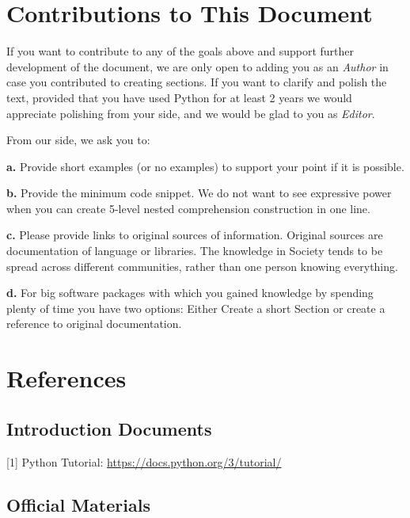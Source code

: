 \documentclass[
]{article}
\begin{document}
\hypertarget{contributions-to-this-document}{%
\section{Contributions to This
Document}\label{contributions-to-this-document}}

If you want to contribute to any of the goals above and support further
development of the document, we are only open to adding you as an
\emph{Author} in case you contributed to creating sections. If you want
to clarify and polish the text, provided that you have used Python for
at least 2 years we would appreciate polishing from your side, and we
would be glad to you as \emph{Editor}.

From our side, we ask you to:

\textbf{a.} Provide short examples (or no examples) to support your
point if it is possible.

\textbf{b.} Provide the minimum code snippet. We do not want to see
expressive power when you can create 5-level nested comprehension
construction in one line.

\textbf{c.} Please provide links to original sources of information.
Original sources are documentation of language or libraries. The
knowledge in Society tends to be spread across different communities,
rather than one person knowing everything.

\textbf{d.} For big software packages with which you gained knowledge by
spending plenty of time you have two options: Either Create a short
Section or create a reference to original documentation.

\hypertarget{references}{%
\section{References}\label{references}}

\hypertarget{introduction-documents}{%
\subsection{Introduction Documents}\label{introduction-documents}}

{[}1{]} Python Tutorial: \url{https://docs.python.org/3/tutorial/}

\hypertarget{official-materials}{%
\subsection{Official Materials}\label{official-materials}}
\end{document}
